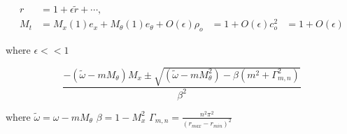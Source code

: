 \documentclass[a4paper]{article}
\begin{document}
\begin{align}
    r &= 1 + \epsilon \tilde{r} + \cdots,\\
    M_t &= M_x(1) e_x + M_{\theta}(1) e_{\theta} + O(\epsilon)
    \rho_o &= 1 + O(\epsilon) 
    c_o^2 &=   1 + O(\epsilon)
\end{align}

where $\epsilon << 1$ 


\begin{equation*}
    \frac{-(\tilde{\omega} - m M_{\theta})M_x \pm \sqrt{\left( \tilde{\omega} - m M_{\theta}^2 \right) - \beta\left( m^2 + \Gamma_{m,n} ^2 \right)}}{\beta^2}
\end{equation*}

where 
$\tilde{\omega} = \omega - m M_{\theta}$
$\beta = 1- M_x^2$
$\Gamma_{m,n}= \frac{n^2 \pi^2}{\left( r_{max} - r_{min} \right)^2}$


\end{document}
